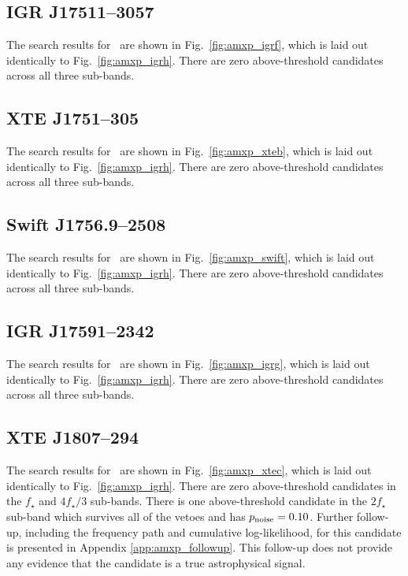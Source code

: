 \subsection{IGR J17511--3057  \label{sec:amxp_igrf} }
The search results for \igrf\ are shown in Fig.~\ref{fig:amxp_igrf}, which is laid out identically to Fig.~\ref{fig:amxp_igrh}. There are zero above-threshold candidates across all three sub-bands.

\subsection{XTE J1751--305  \label{sec:amxp_xteb} }
The search results for \xteb\ are shown in Fig.~\ref{fig:amxp_xteb}, which is laid out identically to Fig.~\ref{fig:amxp_igrh}. There are zero above-threshold candidates across all three sub-bands.

\subsection{Swift J1756.9--2508 \label{sec:amxp_swift} }
The search results for \swift\ are shown in Fig.~\ref{fig:amxp_swift}, which is laid out identically to Fig.~\ref{fig:amxp_igrh}. There are zero above-threshold candidates across all three sub-bands.

\subsection{IGR J17591--2342  \label{sec:amxp_igrg} }
The search results for \igrg\ are shown in Fig.~\ref{fig:amxp_igrg}, which is laid out identically to Fig.~\ref{fig:amxp_igrh}. There are zero above-threshold candidates across all three sub-bands.

\subsection{XTE J1807--294  \label{sec:amxp_xtec} }
The search results for \xtec\ are shown in Fig.~\ref{fig:amxp_xtec}, which is laid out identically to Fig.~\ref{fig:amxp_igrh}. There are zero above-threshold candidates in the $f_\star$ and $4f_\star / 3$ sub-bands. There is one above-threshold candidate in the $2f_\star$ sub-band which survives all of the vetoes and has $p_{\rm noise}=0.10$. Further follow-up, including the frequency path and cumulative log-likelihood, for this candidate is presented in Appendix \ref{app:amxp_followup}. This follow-up does not provide any evidence that the candidate is a true astrophysical signal.

